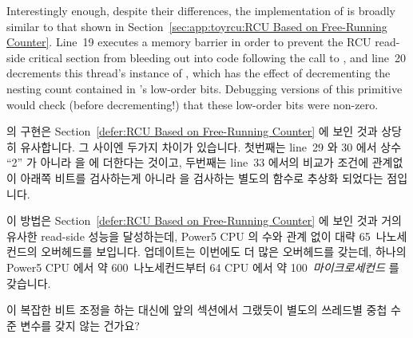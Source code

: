 Interestingly enough, despite their  differences,
the implementation of 
is broadly similar to that shown in
Section~\ref{sec:app:toyrcu:RCU Based on Free-Running Counter}.
Line~19 executes a memory barrier in order to prevent the RCU read-side
critical section from bleeding out into code following the call
to , and
line~20 decrements this thread's instance of ,
which has the effect of decrementing the nesting count contained in
's low-order bits.
Debugging versions of this primitive would check (before decrementing!)
that these low-order bits were non-zero.
\fi

 의 구현은
Section~\ref{defer:RCU Based on Free-Running Counter} 에 보인 것과 상당히
유사합니다.
그 사이엔 두가지 차이가 있습니다.
첫번째는 line~29 와 30 에서 상수 ``2'' 가 아니라  을
 에 더한다는 것이고, 두번째는 line~33 에서의 비교가 조건에
관계없이 아래쪽 비트를 검사하는게 아니라  을 검사하는
별도의 함수로 추상화 되었다는 점입니다.
\iffalse

The implementation of \co{synchronize_rcu()} is quite similar to
that shown in
Section~\ref{sec:app:toyrcu:RCU Based on Free-Running Counter}.
There are two differences.
The first is that lines~29 and~30 adds \co{RCU_GP_CTR_BOTTOM_BIT}
to the global \co{rcu_gp_ctr} instead of adding the constant ``2'',
and the second is that the comparison on line~33 has been abstracted
out to a separate function, where it checks the bit indicated
by \co{RCU_GP_CTR_BOTTOM_BIT} instead of unconditionally checking
the low-order bit.
\fi

이 방법은
Section~\ref{defer:RCU Based on Free-Running Counter} 에 보인 것과 거의 유사한
read-side 성능을 달성하는데, Power5 CPU 의 수와 관계 없이 대략 65~나노세컨드의
오버헤드를 보입니다.
업데이트는 이번에도 더 많은 오버헤드를 갖는데, 하나의 Power5 CPU 에서 약
600~나노세컨드부터 64 CPU 에서 약 100~\emph{마이크로세컨드} 를 갖습니다.
\iffalse

This approach achieves read-side performance almost equal to that
shown in
Section~\ref{sec:app:toyrcu:RCU Based on Free-Running Counter}, incurring
roughly 65~nanoseconds of overhead regardless of the number of
Power5 CPUs.
Updates again incur more overhead, ranging from about 600~nanoseconds on
a single Power5 CPU to more than 100~\emph{microseconds} on 64
such CPUs.
\fi

\QuickQuiz{}
	이 복잡한 비트 조정을 하는 대신에 앞의 섹션에서 그랬듯이 별도의
	쓰레드별 중첩 수준 변수를 갖지 않는 건가요?
	\iffalse


